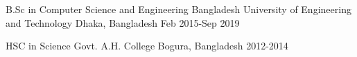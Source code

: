 

\begin{cventries}

  \cventry
    {B.Sc in Computer Science and Engineering} %
    {Bangladesh University of Engineering and Technology} %
    {Dhaka, Bangladesh} %
    {Feb 2015-Sep 2019} %
    {
    }

  \cventry
    {HSC in Science} %
    {Govt. A.H. College} %
    {Bogura, Bangladesh} %
    {2012-2014} %
    {
    }

\end{cventries}
